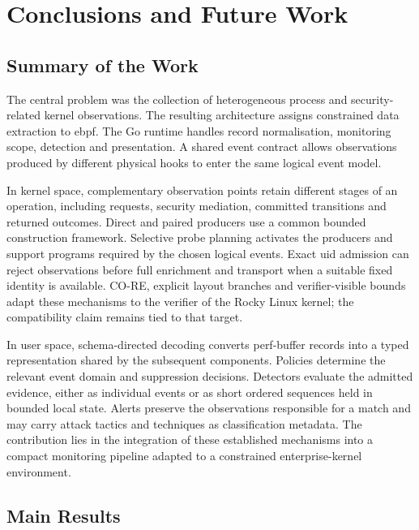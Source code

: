 \chapter{Conclusions and Future Work}
\label{ch:conclusions-future-work}

\section{Summary of the Work}
\label{sec:conclusions-summary-work}

The central problem was the collection of heterogeneous process and
security-related kernel observations. The resulting architecture assigns constrained data
extraction to \gls{ebpf}. The Go runtime handles
record normalisation, monitoring scope, detection and presentation. A shared
event contract allows observations produced by different physical hooks to
enter the same logical event model.

In kernel space, complementary observation points retain different stages of
an operation, including requests, security mediation, committed transitions
and returned outcomes. Direct and paired producers use a common bounded
construction framework. Selective probe planning activates the producers and
support programs required by the chosen logical events. Exact \gls{uid}
admission can reject observations before full enrichment and transport when a
suitable fixed identity is available. CO-RE, explicit layout branches and
verifier-visible bounds adapt these mechanisms to the verifier of the Rocky Linux
kernel; the compatibility claim remains tied to that target.

In user space, schema-directed decoding converts perf-buffer records into a
typed representation shared by the subsequent components. Policies determine
the relevant event domain and suppression decisions. Detectors evaluate the
admitted evidence, either as individual events or as short ordered sequences
held in bounded local state. Alerts preserve the observations responsible for
a match and may carry \gls{attack} tactics and techniques as classification
metadata. The contribution lies in the integration of these established
mechanisms into a compact monitoring pipeline adapted to a constrained
enterprise-kernel environment.

\section{Main Results}
\label{sec:conclusions-main-results}

